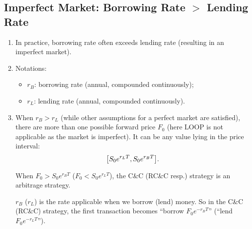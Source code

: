 \subsection{Imperfect Market: Borrowing Rate \(>\) Lending Rate}
\begin{enumerate}
\item In practice, borrowing rate often exceeds lending rate (resulting in an
imperfect market).
\item Notations:
\begin{itemize}
\item \(r_B\): borrowing rate (annual, compounded continuously);
\item \(r_L\): lending rate (annual, compounded continuously).
\end{itemize}
\item \label{it:imper-fwd-price-interval}
When \(r_B>r_L\) (while other assumptions for a perfect market are satisfied),
there are more than one possible forward price \(F_0\) (here LOOP is not
applicable as the market is imperfect). It can be any value lying in the price
interval:
\[
\qty[S_0e^{r_LT},S_0e^{r_BT}].
\]
\begin{pf}
When \(F_0>S_0e^{r_BT}\) (\(F_0<S_0e^{r_LT}\)), the C\&C (RC\&C resp.) strategy
is an arbitrage strategy.
\begin{note}
\(r_B\) (\(r_L\)) is the rate applicable when we borrow (lend) money. So in the
C\&C (RC\&C) strategy, the first transaction becomes ``borrow \(F_0e^{-r_BT}\)''
(``lend \(F_0e^{-r_LT}\)'').
\end{note}
\end{pf}
\end{enumerate}
